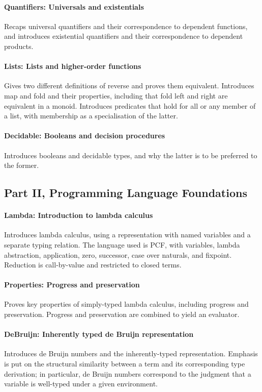 \documentclass[runningheads]{llncs}
\begin{document}
\paragraph{Quantifiers: Universals and existentials}
Recaps universal quantifiers and their correspondence to dependent
functions, and introduces existential quantifiers and their
correspondence to dependent products.

\paragraph{Lists: Lists and higher-order functions}
Gives two different definitions of reverse and proves them equivalent.
Introduces map and fold and their properties, including that fold left
and right are equivalent in a monoid.  Introduces predicates that hold
for all or any member of a list, with membership as a specialisation
of the latter.

\paragraph{Decidable: Booleans and decision procedures}
Introduces booleans and decidable types, and why the latter is to be
preferred to the former.

\subsection*{Part II, Programming Language Foundations}

\paragraph{Lambda: Introduction to lambda calculus}
Introduces lambda calculus, using a representation with named
variables and a separate typing relation. The language used is PCF,
with variables, lambda abstraction, application, zero, successor, case
over naturals, and fixpoint. Reduction is call-by-value and restricted
to closed terms.

\paragraph{Properties: Progress and preservation}
Proves key properties of simply-typed
lambda calculus, including progress and preservation.  Progress and
preservation are combined to yield an evaluator.

\paragraph{DeBruijn: Inherently typed de Bruijn representation}
Introduces de Bruijn numbers and the inherently-typed representation.
Emphasis is put on the structural similarity between a term and its
corresponding type derivation; in particular, de Bruijn numbers
correspond to the judgment that a variable is well-typed under a given
environment.
\end{document}
